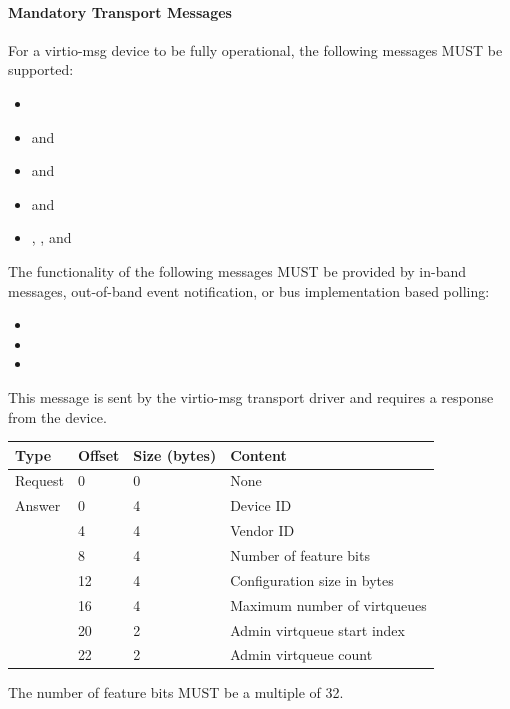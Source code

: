 \paragraph{Mandatory Transport Messages}
For a virtio-msg device to be fully operational, the following messages
MUST be supported:
\begin{itemize}
  \item {}
  \item {} and 
  \item {} and 
  \item {} and 
  \item {}, , and 
\end{itemize}

The functionality of the following messages MUST be provided by
in-band messages, out-of-band event notification, or bus implementation based
polling:
\begin{itemize}
  \item {}
  \item {}
  \item {}
\end{itemize}


This message is sent by the virtio-msg transport driver and requires a
response from the device.

\begin{tabular}{|l|l|l|l|}
\hline
Type & Offset & Size (bytes) & Content \\
\hline \hline
Request & 0 & 0 & None \\
\hline
Answer & 0 & 4 & Device ID \\
& 4 & 4 & Vendor ID \\
& 8 & 4 & Number of feature bits \\
& 12 & 4 & Configuration size in bytes \\
& 16 & 4 & Maximum number of virtqueues \\
& 20 & 2 & Admin virtqueue start index \\
& 22 & 2 & Admin virtqueue count \\
\hline
\end{tabular}

The number of feature bits MUST be a multiple of 32.

